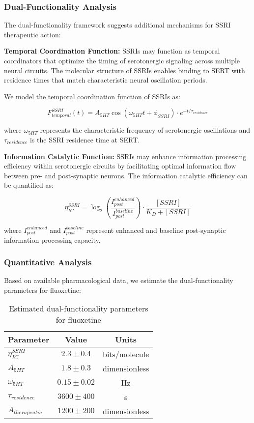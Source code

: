 \documentclass[12pt,a4paper]{article}
\begin{document}
\subsubsection{Dual-Functionality Analysis}

The dual-functionality framework suggests additional mechanisms for SSRI therapeutic action:

\textbf{Temporal Coordination Function:}
SSRIs may function as temporal coordinators that optimize the timing of serotonergic signaling across multiple neural circuits. The molecular structure of SSRIs enables binding to SERT with residence times that match characteristic neural oscillation periods.

We model the temporal coordination function of SSRIs as:

$$F_{temporal}^{SSRI}(t) = A_{5HT} \cos(\omega_{5HT} t + \phi_{SSRI}) \cdot e^{-t/\tau_{residence}}$$

where $\omega_{5HT}$ represents the characteristic frequency of serotonergic oscillations and $\tau_{residence}$ is the SSRI residence time at SERT.

\textbf{Information Catalytic Function:}
SSRIs may enhance information processing efficiency within serotonergic circuits by facilitating optimal information flow between pre- and post-synaptic neurons. The information catalytic efficiency can be quantified as:

$$\eta_{IC}^{SSRI} = \log_2\left(\frac{I_{post}^{enhanced}}{I_{post}^{baseline}}\right) \cdot \frac{[SSRI]}{K_D + [SSRI]}$$

where $I_{post}^{enhanced}$ and $I_{post}^{baseline}$ represent enhanced and baseline post-synaptic information processing capacity.

\subsubsection{Quantitative Analysis}

Based on available pharmacological data, we estimate the dual-functionality parameters for fluoxetine:

\begin{table}[h]
\centering
\caption{Estimated dual-functionality parameters for fluoxetine}
\begin{tabular}{lcc}
\toprule
Parameter & Value & Units \\
\midrule
$\eta_{IC}^{SSRI}$ & $2.3 \pm 0.4$ & bits/molecule \\
$A_{5HT}$ & $1.8 \pm 0.3$ & dimensionless \\
$\omega_{5HT}$ & $0.15 \pm 0.02$ & Hz \\
$\tau_{residence}$ & $3600 \pm 400$ & s \\
$A_{therapeutic}$ & $1200 \pm 200$ & dimensionless \\
\bottomrule
\end{tabular}
\label{tab:fluoxetine_parameters}
\end{table}
\end{document}
